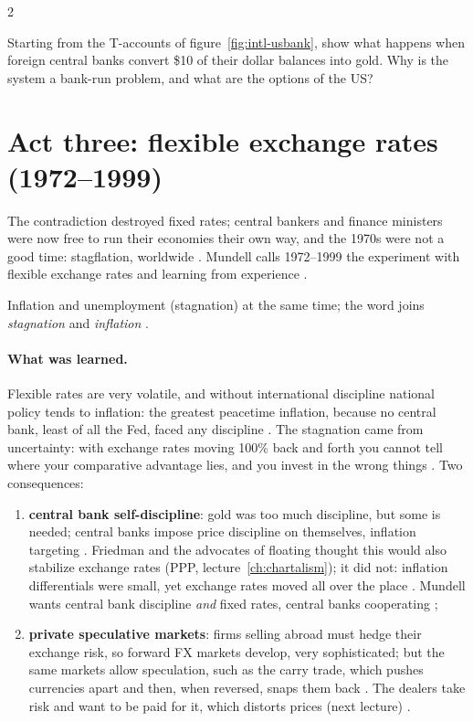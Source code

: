 \begin{paracol}{2}
\begin{exercise}
Starting from the T-accounts of figure~\ref{fig:intl-usbank}, show what happens when foreign central banks convert \$10 of their dollar balances into gold. Why is
the system a bank-run problem, and what are the options of the US?
\end{exercise}


\section{Act three: flexible exchange rates (1972--1999)}\label{sec:intl-act3}

The contradiction destroyed fixed rates; central bankers and finance ministers were now free to run their economies their own way, and the 1970s were not a good
time: stagflation, worldwide . Mundell calls 1972--1999 the experiment with flexible exchange rates and learning
from experience .

\begin{definition}
Inflation and unemployment (stagnation) at the same time; the word joins \emph{stagnation} and \emph{inflation} .
\end{definition}

\paragraph{What was learned.} Flexible rates are very volatile, and without international discipline national policy tends to inflation: the greatest peacetime
inflation, because no central bank, least of all the Fed, faced any discipline . The stagnation came from
uncertainty: with exchange rates moving 100\% back and forth you cannot tell where your comparative advantage lies, and you invest in the wrong things
. Two consequences:
\begin{enumerate}
  \item \textbf{central bank self-discipline}: gold was too much discipline, but some is needed; central banks impose price discipline on themselves, inflation
        targeting . Friedman and the advocates of floating thought this would also stabilize exchange rates (PPP,
        lecture~\ref{ch:chartalism}); it did not: inflation differentials were small, yet exchange rates moved all over the place
        . Mundell wants central bank discipline \emph{and} fixed rates, central banks cooperating ;
  \item \textbf{private speculative markets}: firms selling abroad must hedge their exchange risk, so forward FX markets develop, very sophisticated; but the same
        markets allow speculation, such as the carry trade, which pushes currencies apart and then, when reversed, snaps them back
        . The dealers take risk and want to be paid for it, which distorts prices
        (next lecture) .
\end{enumerate}


\end{paracol}
